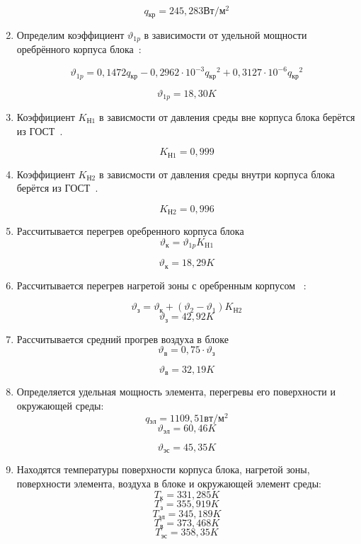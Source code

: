 \begin{enumerate}[label={\arabic*.}]
    $$q\mathrm{_{кр}} = 245,283 \mathrm{Вт/м^2}$$

\item
    Определим коэффициент $\vartheta_{1p}$ в зависимости от удельной
    мощности оребрённого корпуса блока~\cite{Rotkop1976}:

\begin{equation}
\vartheta_{1p} = 0,1472q\mathrm{_{кр}} - 0,2962 \cdot 10^{-3}q\mathrm{_{кр}}^2 + 0,3127 \cdot 10^{-6}q\mathrm{_{кр}}^2      
\end{equation}

$$\vartheta_{1p}= 18,30K$$

\item Коэффициент $K\mathrm{_{Н1}}$ в зависмости от давления
  среды вне корпуса блока берётся из ГОСТ~\cite{GOST-15150-69}.

  $$K\mathrm{_{Н1}} = 0,999$$


\item Коэффициент $K\mathrm{_{Н2}}$ в зависмости от давления
  среды внутри корпуса блока берётся из ГОСТ~\cite{GOST-15150-69}.

  $$K\mathrm{_{Н2}} = 0,996$$

\item Рассчитывается перегрев оребренного корпуса блока
  \begin{equation}
    \vartheta\mathrm{_к} =\vartheta{_{1p}}K\mathrm{_{H1}}
  \end{equation}

  $$\vartheta\mathrm{_к} = 18,29K$$

\item Рассчитывается
  перегрев нагретой зоны
  с оребренным корпусом ~\cite{Rotkop1976}:

\begin{equation}
    \vartheta\mathrm{_з} = \vartheta{_к} +(\vartheta_2 - \vartheta_1)K\mathrm{_{Н2}}
  \end{equation}
  $$\vartheta\mathrm{_з} = 42,92K$$

\item Рассчитывается средний прогрев воздуха в блоке
  \begin{equation}
    \vartheta\mathrm{_в} = 0,75 \cdot \vartheta\mathrm{_з}
  \end{equation}
  
  $$\vartheta\mathrm{_в} = 32,19K$$

\item Определяется удельная мощность элемента, перегревы его
    поверхности и окружающей среды:
    $$q\mathrm{_{эл}} =1109,51\mathrm{вт/м^2}$$
    $$\vartheta\mathrm{_{эл}} = 60,46 K$$

    $$\vartheta\mathrm{_{эс}} = 45,35 K$$

  \item Находятся температуры поверхности корпуса блока, нагретой
зоны, поверхности элемента, воздуха в блоке и окружающей элемент
среды:
$$T\mathrm{_{к}} = 331,285 K$$
$$T\mathrm{_з} = 355,919 K$$
$$T\mathrm{_{эл}} = 345,189 K$$
$$T\mathrm{_{в}} = 373,468 K$$
$$T\mathrm{_{эс}} =358,35 K$$

\end{enumerate}